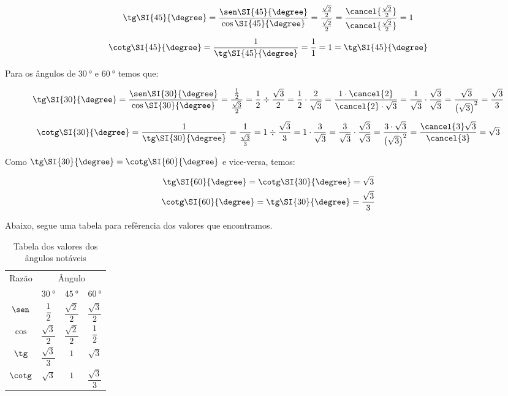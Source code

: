 \begin{gather*}
	\tg\SI{45}{\degree}=\frac{\sen\SI{45}{\degree}}{\cos\SI{45}{\degree}}=\frac{\frac{\sqrt{2}}{2}}{\frac{\sqrt{2}}{2}}=\frac{\cancel{\frac{\sqrt{2}}{2}}}{\cancel{\frac{\sqrt{2}}{2}}}=1\\[0.5em]
	\cotg\SI{45}{\degree}=\frac{1}{\tg\SI{45}{\degree}}=\frac{1}{1}=1=\tg\SI{45}{\degree}
\end{gather*}

Para os ângulos de $\SI{30}{\degree}$ e $\SI{60}{\degree}$ temos que:

\begin{gather*}
	\tg\SI{30}{\degree}=\frac{\sen\SI{30}{\degree}}{\cos\SI{30}{\degree}}=\frac{\frac{1}{2}}{\frac{\sqrt{3}}{2}}=\frac{1}{2}\div\frac{\sqrt{3}}{2}=\frac{1}{2}\cdot\frac{2}{\sqrt{3}}=\frac{1\cdot\cancel{2}}{\cancel{2}\cdot\sqrt{3}}=\frac{1}{\sqrt{3}}\cdot\frac{\sqrt{3}}{\sqrt{3}}=\frac{\sqrt{3}}{\left(\sqrt{3}\right)^2}=\frac{\sqrt{3}}{3}\\[0.5em]
	\cotg\SI{30}{\degree}=\frac{1}{\tg\SI{30}{\degree}}=\frac{1}{\frac{\sqrt{3}}{3}}=1\div\frac{\sqrt{3}}{3}=1\cdot\frac{3}{\sqrt{3}}=\frac{3}{\sqrt{3}}\cdot\frac{\sqrt{3}}{\sqrt{3}}=\frac{3\cdot\sqrt{3}}{\left(\sqrt{3}\right)^2}=\frac{\cancel{3}\sqrt{3}}{\cancel{3}}=\sqrt{3}
\end{gather*}

Como $\tg\SI{30}{\degree}=\cotg\SI{60}{\degree}$ e vice-versa, temos:

\begin{gather*}
	\tg\SI{60}{\degree}=\cotg\SI{30}{\degree}=\sqrt{3}\\
	\cotg\SI{60}{\degree}=\tg\SI{30}{\degree}=\frac{\sqrt{3}}{3}
\end{gather*}

Abaixo, segue uma tabela para refêrencia dos valores que encontramos.

\begin{table}[H]
	\centering
	\begin{tabular}{*{4}{c}}
		\toprule
		Razão   & \multicolumn{3}{c}{Ângulo}                                                 \\
		\cmidrule(lr){2-4}
		        & $\SI{30}{\degree}$         & $\SI{45}{\degree}$    & $\SI{60}{\degree}$    \\ \midrule
		$\sen$  & $\dfrac{1}{2}$             & $\dfrac{\sqrt{2}}{2}$ & $\dfrac{\sqrt{3}}{2}$ \\[5pt]
		$\cos$  & $\dfrac{\sqrt{3}}{2}$      & $\dfrac{\sqrt{2}}{2}$ & $\dfrac{1}{2}$        \\[5pt]
		$\tg$   & $\dfrac{\sqrt{3}}{3}$      & $1$                   & $\sqrt{3}$            \\[5pt]
		$\cotg$ & $\sqrt{3}$                 & $1$                   & $\dfrac{\sqrt{3}}{3}$ \\[5pt]
		\bottomrule
	\end{tabular}
	\caption{Tabela dos valores dos ângulos notáveis}
\end{table}


